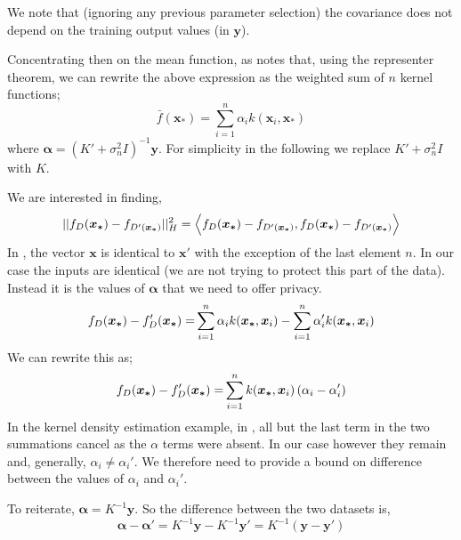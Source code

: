 \documentclass[a4paper]{article}
\begin{document}
\begin{multicols}{2}
We note that (ignoring any previous parameter selection) the covariance does not depend on the training output values (in $\bm{y}$).

Concentrating then on the mean function, as \citet{williams2006gaussian} notes that, using the representer theorem, we can rewrite the above expression as the weighted sum of $n$ kernel functions;
\begin{equation}
\bar{f}(\bm{x}_*) = \sum_{i=1}^n {\alpha_i k(\bm{x}_i,\bm{x}_*)}
\label{gp_rep_mean}
\end{equation}
where $\bm{\alpha} = \left( K' + \sigma_n^2 I \right)^{-1} \bm{y}$. For simplicity in the following we replace $K' + \sigma_n^2 I$ with $K$.

We are interested in finding,
\begin{dmath}
|| f_D(\bm{x_*}) - f_{D'(\bm{x_*})} ||_H^2 = \\ \Big{\langle} f_D(\bm{x_*}) - f_{D'(\bm{x_*})}, f_D(\bm{x_*}) - f_{D'(\bm{x_*})} \Big{\rangle}
\label{norm_squared}
\end{dmath}
In \citet{hall2013differential}, the vector $\bm{x}$ is identical to $\bm{x'}$ with the exception of the last element $n$. In our case the inputs are identical (we are not trying to protect this part of the data). Instead it is the values of $\bm{\alpha}$ that we need to offer privacy.
\begin{dmath}
{f_D(\bm{x_*}) - f_D'(\bm{x_*})=} \\ \sum_{i=1}^n \alpha_i k(\bm{x_*},\bm{x}_i) \\ - \sum_{i=1}^n \alpha'_i k(\bm{x_*},\bm{x}_i)
\label{fun_diff}
\end{dmath}
We can rewrite this as;
\begin{dmath}
{f_D(\bm{x_*}) - f_D'(\bm{x_*})=} \\  \sum_{i=1}^n k(\bm{x_*},\bm{x}_i) \left(\alpha_i - \alpha'_i\right)
\label{fun_diff}
\end{dmath}
In the kernel density estimation example, in \citet{hall2013differential}, all but the last term in the two summations cancel as the $\alpha$ terms were absent. In our case however they remain and, generally, $\alpha_i \neq \alpha_i'$. We therefore need to provide a bound on difference between the values of $\alpha_i$ and $\alpha_i'$.

To reiterate, $\bm{\alpha} = K^{-1} \bm{y}$. So the difference between the two datasets is,
\begin{dmath}
\bm{\alpha} - \bm{\alpha}' = K^{-1} \bm{y} - K^{-1} \bm{y'} = K^{-1} \left(\bm{y} - \bm{y}' \right)
\label{alphadiff}
\end{dmath}


\end{multicols}
\end{document}
